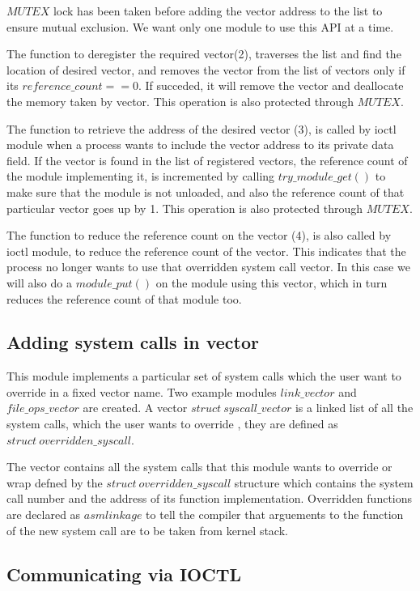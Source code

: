 \documentclass[11pt]{article}
\begin{document}
$MUTEX$ lock has been taken before adding the vector address to the list to ensure mutual exclusion.
We want only one module to use this API at a time.

The function to deregister the required vector(2), traverses the list and find the location of desired vector, and 
removes the vector from the list of vectors only if its $reference\_count==0$. If succeded, it will remove the vector and 
deallocate the memory taken by vector. This operation is also protected through $MUTEX$.

The function to retrieve the address of the desired vector (3), is called by ioctl module when a process wants to include the
vector address to its private data field. If the vector is found in the list of registered vectors, the reference count of the module implementing it, is incremented by calling $try\_module\_get()$ to make sure that the module is not unloaded, and also
the reference count of that particular vector goes up by 1. This operation is also protected through $MUTEX$.

The function to reduce the reference count on the vector (4), is also called by ioctl module, to reduce the reference count of the vector. This indicates that the process no longer wants to use that overridden system call vector.
In this case we will also do a $module\_put()$ on the module using this vector, which in turn reduces the reference count of
that module too.


\subsection{Adding system calls in vector}

This module implements a particular set of system calls which the user want to override in a fixed vector name. Two example modules $link\_vector$ and $file\_ops\_vector$ are created. A vector $struct\ syscall\_vector$ is a linked list of all the system calls, which the user wants
to override , they are defined as $struct\ overridden\_syscall$. 

The vector contains all the system calls that this module wants to override or wrap defned by the $struct\ overridden\_syscall$ structure which contains the system call number and the address of its function implementation. Overridden functions are declared as $asmlinkage$ to tell the compiler that arguements to the function of the new system call are to be taken from kernel stack.

\subsection{Communicating via IOCTL}
\end{document}
